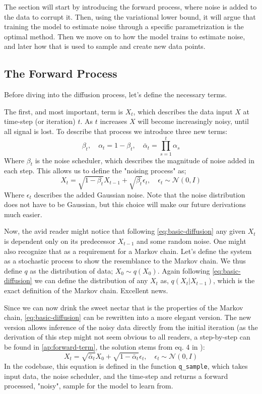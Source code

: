 The section will start by introducing the forward process, where noise is added to the data to corrupt it. Then, using the variational lower bound, it will argue that training the model to estimate noise through a specific parametrization is the optimal method. Then we move on to how the model trains to estimate noise, and later how that is used to sample and create new data points.

\subsection{The Forward Process}
Before diving into the diffusion process, let's define the necessary terms.

The first, and most important, term is $X_t$, which describes the data input $X$ at time-step (or iteration) $t$. As $t$ increases $X$ will become increasingly noisy, until all signal is lost. To describe that process we introduce three new terms:
\begin{equation} \label{eq:schedule}
    \beta_t, \quad \alpha_t = 1- \beta_t, \quad \bar{\alpha}_t = \prod_{s=1}^t \alpha_s
\end{equation}
Where $\beta_t$ is the noise scheduler, which describes the magnitude of noise added in each step. This allows us to define the "noising process" as; 
\begin{equation} \label{eq:basic-diffusion}
    X_t = \sqrt{1-\beta_t} X_{t-1} + \sqrt{\beta_t} \epsilon_t, \quad \epsilon_t \sim \mathcal{N}(0,I)
\end{equation}
Where $\epsilon_t$ describes the added Gaussian noise. Note that the noise distribution does not have to be Gaussian, but this choice will make our future derivations much easier. 

Now, the avid reader might notice that following \autoref{eq:basic-diffusion} any given $X_t$ is dependent only on its predecessor $X_{t-1}$ and some random noise. One might also recognize that as a requirement for a Markov chain. Let's define the system as a stochastic process to show the resemblance to the Markov chain. We thus define $q$ as the distribution of data; $X_0 \sim q(X_0)$. Again following \autoref{eq:basic-diffusion} we can define the distribution of any $X_t$ as, $q(X_t | X_{t-1})$, which is the exact definition of the Markov chain. Excellent news.

Since we can now drink the sweet nectar that is the properties of the Markov chain, \autoref{eq:basic-diffusion} can be rewritten into a more elegant version. The new version allows inference of the noisy data directly from the initial iteration (as the derivation of this step might not seem obvious to all readers, a step-by-step can be found in \autoref{ap:forward-term}, the solution stems from eq. 4 in \cite{ddpm}):
\begin{equation} \label{eq:forward-process}
    X_t = \sqrt{\bar{\alpha}_t}X_0+\sqrt{1-\bar{\alpha}_t} \epsilon_t, \quad \epsilon_t \sim \mathcal{N}(0,I)
\end{equation}
In the codebase, this equation is defined in the function \lstinline{q_sample}, which takes input data, the noise scheduler, and the time-step and returns a forward processed, "noisy", sample for the model to learn from.


